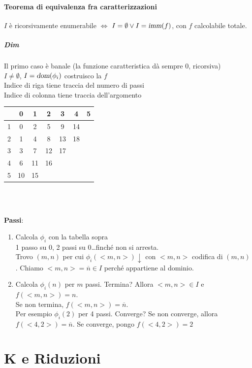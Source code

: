 \documentclass[10pt]{book}
\begin{document}
\paragraph{Teorema di equivalenza fra caratterizzazioni}
$I$ è ricorsivamente enumerabile $\Leftrightarrow$ $I = \emptyset \vee I = \textsl{imm}(f)$, con $f$ calcolabile totale.
\begin{multicols}{2}
\subparagraph{Dim} Il primo caso è banale (la funzione caratteristica dà sempre 0, ricorsiva)\\
$I \neq \emptyset$, $I = \textsl{dom}(\phi_i)$ costruisco la $f$\\
Indice di riga tiene traccia del numero di passi\\
Indice di colonna tiene traccia dell'argomento\\
\begin{tabular}{c || c | c | c | c | c | c}
	 & 0 & 1 & 2 & 3 & 4 & 5 \\
	 \hline
	 \hline
	 1 & 0 & 2 & 5 & 9 & 14 & \\
	 \hline
	 2 & 1 & 4 & 8 & 13 & 18 & \\
	 \hline
	 3 & 3 & 7 & 12 & 17 & & \\
	 \hline
	 4 & 6 & 11 & 16 & & & \\
	 \hline
	 5 & 10 & 15 & & & &
	\end{tabular}\\\\
\end{multicols}
\textbf{Passi}:
\begin{enumerate}
	\item Calcola $\phi_i$ con la tabella sopra\\
	1 passo su 0, 2 passi su 0\ldots finché non si arresta.\\
	Trovo $(m, n)$ per cui $\phi_i(<m, n>)\downarrow$ con $<m, n>$ codifica di $(m, n)$. Chiamo $<m, n> = \overline{n} \in I$ perché appartiene al dominio.
	 \item Calcola $\phi_i(n)$ per $m$ passi. Termina? Allora $<m, n> \in I$ e $f(<m, n>) = n$.\\
	 Se non termina, $f(<m, n>) = \overline{n}$.\\
	 Per esempio $\phi_i(2)$ per 4 passi. Converge? Se non converge, allora $f(<4, 2>) = \overline{n}$. Se converge, pongo $f(<4, 2>) = 2$
\end{enumerate}
\section{K e Riduzioni}
\end{document}
